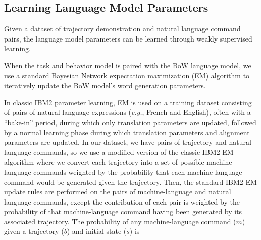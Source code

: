\documentclass[conference]{IEEEtran}
\begin{document}
\subsection{Learning Language Model Parameters}
Given a dataset of trajectory demonstration and natural language command pairs, the language model parameters can be learned through weakly supervised learning. 

When the task and behavior model is paired with the BoW language model, we use a standard Bayesian Network expectation maximization (EM) algorithm \cite{dempster77} to iteratively update the BoW model's word generation parameters. 

In classic IBM2 parameter learning, EM is used on a training dataset consisting of pairs of natural language expressions (\emph{e.g.}, French and English), often with a ``bake-in'' period, during which only translation parameters are updated, followed by a normal learning phase during which translation parameters and alignment parameters are updated. In our dataset, we have pairs of trajectory and natural language commands, so we use a modified version of the classic IBM2 EM algorithm where we convert each trajectory into a set of possible machine-language commands weighted by the probability that each machine-language command would be generated given the trajectory. Then, the standard IBM2 EM update rules are performed on the pairs of machine-language and natural language commands, except the contribution of each pair is weighted by the probability of that machine-language command having been generated by its associated trajectory. The probability of any machine-language command ($m$) given a trajectory ($b$) and initial state ($s$) is
\end{document}
